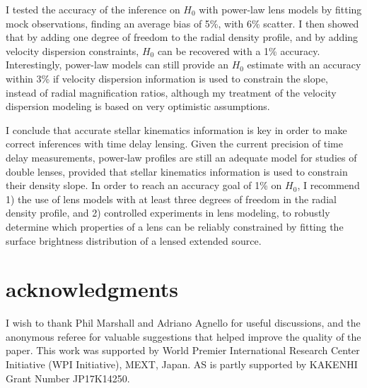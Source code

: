 \documentclass[usenatbib]{mnras}
\begin{document}
I tested the accuracy of the inference on $H_0$ with power-law lens models by fitting mock observations, finding an average bias of 5\%, with 6\% scatter.
I then showed that by adding one degree of freedom to the radial density profile, and by adding velocity dispersion constraints, $H_0$ can be recovered with a 1\% accuracy.
Interestingly, power-law models can still provide an $H_0$ estimate with an accuracy within 3\% if velocity dispersion information is used to constrain the slope, instead of radial magnification ratios, although my treatment of the velocity dispersion modeling is based on very optimistic assumptions.

I conclude that accurate stellar kinematics information is key in order to make correct inferences with time delay lensing. Given the current precision of time delay measurements, power-law profiles are still an adequate model for studies of double lenses, provided that stellar kinematics information is used to constrain their density slope.
In order to reach an accuracy goal of 1\% on $H_0$, I recommend 1) the use of lens models with at least three degrees of freedom in the radial density profile, and 
2) controlled experiments in lens modeling, to robustly determine which properties of a lens can be reliably constrained by fitting the surface brightness distribution of a lensed extended source.

\section*{acknowledgments}
I wish to thank Phil Marshall and Adriano Agnello for useful discussions, and the anonymous referee for valuable suggestions that helped improve the quality of the paper.
This work was supported by World Premier International Research Center Initiative (WPI Initiative), MEXT, Japan.
AS is partly supported by KAKENHI Grant Number JP17K14250. 



\appendix
\onecolumn
\end{document}
